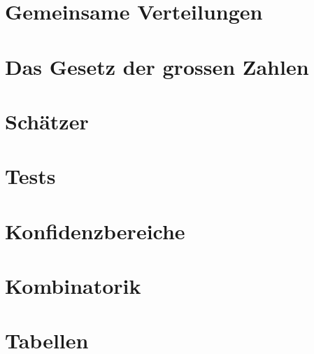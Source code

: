 \documentclass{article}
\begin{document}
\newsection
\section{Gemeinsame Verteilungen}



% 


\newsectionNoPB
\section{Das Gesetz der grossen Zahlen}





% 


\newsection
\section{Schätzer}




% 

\newsection
\section{Tests}




% 

\newsection
\section{Konfidenzbereiche}


% 

\newsection
\section{Kombinatorik}




% 


\newsectionNoPB
\section{Tabellen}




% 
\end{document}
